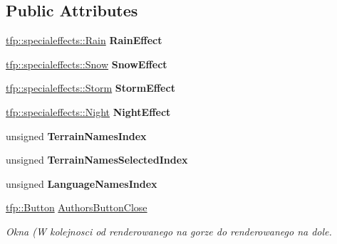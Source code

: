 \subsection*{Public Attributes}
\begin{DoxyCompactItemize}
\item 
\mbox{\label{classtfp_1_1_interface_a1cc8ce6ec7bbced969a3e936fd46737b}} 
\mbox{\hyperlink{classtfp_1_1specialeffects_1_1_rain}{tfp\+::specialeffects\+::\+Rain}} {\bfseries Rain\+Effect}
\item 
\mbox{\label{classtfp_1_1_interface_a2d72554c48faef83eb8fe468a861415c}} 
\mbox{\hyperlink{classtfp_1_1specialeffects_1_1_snow}{tfp\+::specialeffects\+::\+Snow}} {\bfseries Snow\+Effect}
\item 
\mbox{\label{classtfp_1_1_interface_a65bc11e80f988f8e97d2f94cb1fce805}} 
\mbox{\hyperlink{classtfp_1_1specialeffects_1_1_storm}{tfp\+::specialeffects\+::\+Storm}} {\bfseries Storm\+Effect}
\item 
\mbox{\label{classtfp_1_1_interface_a3393f509bdaf62f71bb535262d6f6926}} 
\mbox{\hyperlink{classtfp_1_1specialeffects_1_1_night}{tfp\+::specialeffects\+::\+Night}} {\bfseries Night\+Effect}
\item 
\mbox{\label{classtfp_1_1_interface_a66c45d2aef0d077422b446e7f4f883b3}} 
unsigned {\bfseries Terrain\+Names\+Index}
\item 
\mbox{\label{classtfp_1_1_interface_a442d985e044da5b90dd659af6e918f8f}} 
unsigned {\bfseries Terrain\+Names\+Selected\+Index}
\item 
\mbox{\label{classtfp_1_1_interface_a71d169bd17887bda28106adc503dc0cd}} 
unsigned {\bfseries Language\+Names\+Index}
\item 
\mbox{\label{classtfp_1_1_interface_a90dd8618f5d549313d026920623d4d42}} 
\mbox{\hyperlink{classtfp_1_1_button}{tfp\+::\+Button}} \mbox{\hyperlink{classtfp_1_1_interface_a90dd8618f5d549313d026920623d4d42}{Authors\+Button\+Close}}
\begin{DoxyCompactList}\small\item\em Okna (W kolejnosci od renderowanego na gorze do renderowanego na dole. \end{DoxyCompactList}\item 

\end{DoxyCompactItemize}
